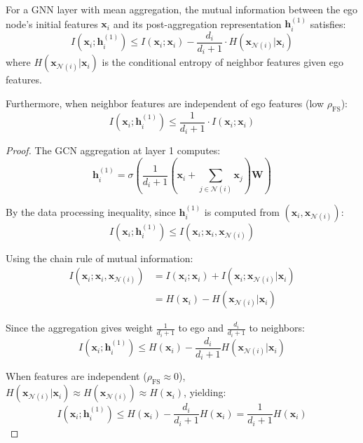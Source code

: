 \begin{lemma}
\label{lem:degree_info_loss}
For a GNN layer with mean aggregation, the mutual information between the ego node's initial features $\mathbf{x}_i$ and its post-aggregation representation $\mathbf{h}_i^{(1)}$ satisfies:
\begin{equation}
I(\mathbf{x}_i; \mathbf{h}_i^{(1)}) \leq I(\mathbf{x}_i; \mathbf{x}_i) - \frac{d_i}{d_i+1} \cdot H(\mathbf{x}_{\mathcal{N}(i)} | \mathbf{x}_i)
\end{equation}
where $H(\mathbf{x}_{\mathcal{N}(i)} | \mathbf{x}_i)$ is the conditional entropy of neighbor features given ego features.

Furthermore, when neighbor features are independent of ego features (low $\rho_{\text{FS}}$):
\begin{equation}
I(\mathbf{x}_i; \mathbf{h}_i^{(1)}) \leq \frac{1}{d_i+1} \cdot I(\mathbf{x}_i; \mathbf{x}_i)
\end{equation}
\end{lemma}

\begin{proof}
The GCN aggregation at layer 1 computes:
\begin{equation}
\mathbf{h}_i^{(1)} = \sigma\left(\frac{1}{d_i+1}\left(\mathbf{x}_i + \sum_{j \in \mathcal{N}(i)} \mathbf{x}_j\right)\mathbf{W}\right)
\end{equation}

By the data processing inequality, since $\mathbf{h}_i^{(1)}$ is computed from $(\mathbf{x}_i, \mathbf{x}_{\mathcal{N}(i)})$:
\begin{equation}
I(\mathbf{x}_i; \mathbf{h}_i^{(1)}) \leq I(\mathbf{x}_i; \mathbf{x}_i, \mathbf{x}_{\mathcal{N}(i)})
\end{equation}

Using the chain rule of mutual information:
\begin{align}
I(\mathbf{x}_i; \mathbf{x}_i, \mathbf{x}_{\mathcal{N}(i)}) &= I(\mathbf{x}_i; \mathbf{x}_i) + I(\mathbf{x}_i; \mathbf{x}_{\mathcal{N}(i)} | \mathbf{x}_i) \\
&= H(\mathbf{x}_i) - H(\mathbf{x}_{\mathcal{N}(i)} | \mathbf{x}_i)
\end{align}

Since the aggregation gives weight $\frac{1}{d_i+1}$ to ego and $\frac{d_i}{d_i+1}$ to neighbors:
\begin{equation}
I(\mathbf{x}_i; \mathbf{h}_i^{(1)}) \leq H(\mathbf{x}_i) - \frac{d_i}{d_i+1} H(\mathbf{x}_{\mathcal{N}(i)} | \mathbf{x}_i)
\end{equation}

When features are independent ($\rho_{\text{FS}} \approx 0$), $H(\mathbf{x}_{\mathcal{N}(i)} | \mathbf{x}_i) \approx H(\mathbf{x}_{\mathcal{N}(i)}) \approx H(\mathbf{x}_i)$, yielding:
\begin{equation}
I(\mathbf{x}_i; \mathbf{h}_i^{(1)}) \leq H(\mathbf{x}_i) - \frac{d_i}{d_i+1}H(\mathbf{x}_i) = \frac{1}{d_i+1}H(\mathbf{x}_i)
\end{equation}
\end{proof}

